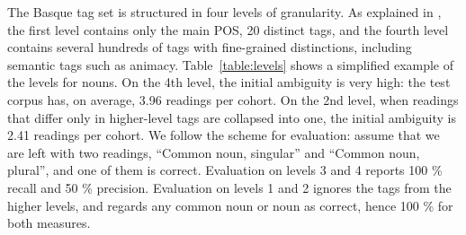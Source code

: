 {{The Basque tag set is structured in four levels of granularity.  As
explained in \cite{ezeiza1998basque}, the first level contains only
the main POS, 20 distinct tags, and the fourth level contains several
hundreds of tags with fine-grained distinctions, including semantic
tags such as animacy.  Table~\ref{table:levels} shows a simplified
example of the levels for nouns.  On the 4th level, the initial
ambiguity is very high: the test corpus has, on average, 3.96 readings
per cohort. On the 2nd level, when readings that differ only in
higher-level tags are collapsed into one, the initial ambiguity is
2.41 readings per cohort.  We follow the scheme for evaluation: assume
that we are left with two readings, ``Common noun, singular'' and
``Common noun, plural'', and one of them is correct. Evaluation on
levels 3 and 4 reports 100 \% recall and 50 \% precision.  Evaluation
on levels 1 and 2 ignores the tags from the higher levels, and regards
any common noun or noun as correct, hence 100 \% for both measures.


\begin{table}[t]
\centering
{}
\end{table}}}
